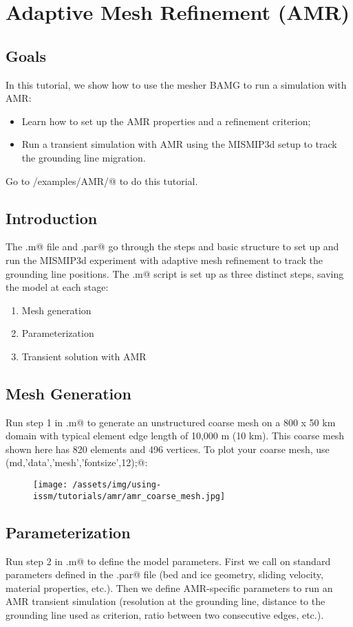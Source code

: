 \section{Adaptive Mesh Refinement (AMR)}
\subsection{Goals} %
In this tutorial, we show how to use the mesher BAMG to run a simulation with AMR:
\begin{itemize}
	\item Learn how to set up the AMR properties and a refinement criterion;
	\item Run a transient simulation with AMR using the MISMIP3d setup to track the grounding line migration.
\end{itemize} 

Go to \verb@trunk/examples/AMR/@ to do this tutorial.
\subsection{Introduction}
The \verb@runme.m@ file and \verb@mismip.par@ go through the steps and basic structure to set up and run the MISMIP3d experiment with adaptive mesh refinement to track the grounding line positions. The \verb@runme.m@ script is set up as three distinct steps, saving the model at each stage:
\begin{enumerate}
	\item Mesh generation
	\item Parameterization
	\item Transient solution with AMR
\end{enumerate}

\subsection{Mesh Generation}
Run step 1 in \verb@runme.m@ to generate an unstructured coarse mesh on a 800 x 50 km domain with typical element edge length of 10,000 m (10 km).  This coarse mesh shown here has 820 elements and 496 vertices. To plot your coarse mesh, use \verb@plotmodel(md,'data','mesh','fontsize',12);@:
\begin{figure}[H]
	\begin{center}
		\texttt{[image: /assets/img/using-issm/tutorials/amr/amr\_coarse\_mesh.jpg]}
	\end{center}
\end{figure}

\subsection{Parameterization}
Run step 2 in \verb@runme.m@ to define the model parameters. First we call on standard parameters defined in the \verb@mismip.par@ file (bed and ice geometry, sliding velocity, material properties, etc.). Then we define AMR-specific parameters to run an AMR transient simulation (resolution at the grounding line, distance to the grounding line used as criterion, ratio between two consecutive edges, etc.).

